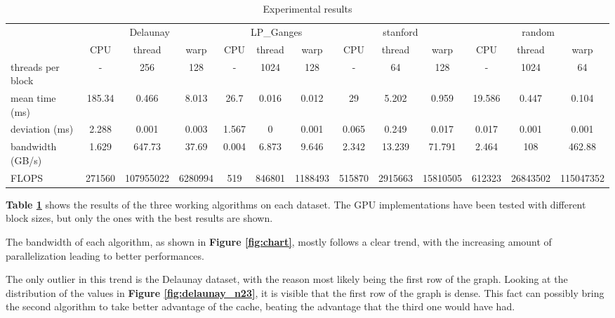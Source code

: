 \documentclass[conference]{IEEEtran}
\begin{document}
\begin{table}[ht!]
    \centering
    \begin{adjustbox}{width=\columnwidth}
        \begin{tabular}{l|ccc|ccc|ccc|ccc}
            \toprule
& \multicolumn{3}{c}{Delaunay} & \multicolumn{3}{c}{LP\_Ganges} & \multicolumn{3}{c}{stanford} & \multicolumn{3}{c}{random} \\
\cmidrule(lr){2-4} \cmidrule(lr){5-7} \cmidrule(lr){8-10} \cmidrule(lr){11-13}
& CPU & thread & warp & CPU & thread & warp & CPU & thread & warp & CPU & thread & warp \\
\midrule
            threads per block & - & 256 & 128 & - & 1024 & 128 & - & 64 & 128 & - & 1024 & 64 \\
            mean time (ms) & 185.34 & 0.466 & 8.013 & 26.7 & 0.016 & 0.012 & 29 & 5.202 & 0.959 & 19.586 & 0.447 & 0.104 \\
            deviation (ms) & 2.288 & 0.001 & 0.003 & 1.567 & 0 & 0.001 & 0.065 & 0.249 & 0.017 & 0.017 & 0.001 & 0.001 \\
            bandwidth (GB/s) & 1.629 & 647.73 & 37.69 & 0.004 & 6.873 & 9.646 & 2.342 & 13.239 & 71.791 & 2.464 & 108 & 462.88 \\
            FLOPS & 271560 & 107955022 & 6280994 & 519 & 846801 & 1188493 & 515870 & 2915663 & 15810505 & 612323 & 26843502 & 115047352 \\
            \bottomrule
        \end{tabular}
    \end{adjustbox}
    \caption{Experimental results}
    \label{tab:results}
\end{table}
\textbf{Table \ref{tab:results}} shows the results of the three working algorithms on each dataset. The GPU implementations have been tested with different block sizes, but only the ones with the best results are shown.

The bandwidth of each algorithm, as shown in \textbf{Figure \ref{fig:chart}}, mostly follows a clear trend, with the increasing amount of parallelization leading to better performances. 

The only outlier in this trend is the Delaunay dataset, with the reason most likely being the first row of the graph. Looking at the distribution of the values in \textbf{Figure \ref{fig:delaunay_n23}}, it is visible that the first row of the graph is dense. This fact can possibly bring the second algorithm to take better advantage of the cache, beating the advantage that the third one would have had.
\end{document}
